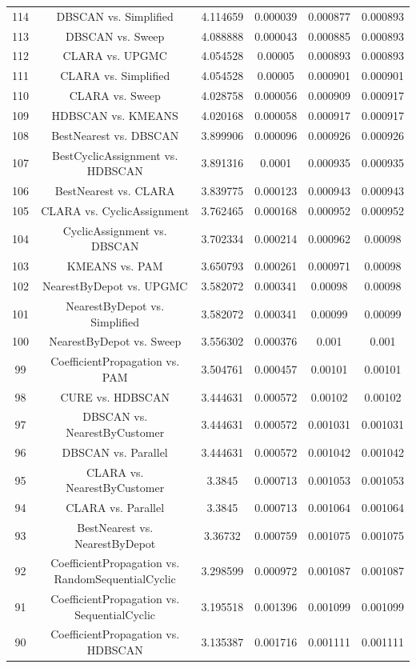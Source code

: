 \documentclass[a4paper,10pt]{article}
\begin{document}
\begin{landscape}
\begin{table}[!htp]
\begin{tabular}{cccccc}
114&DBSCAN vs. Simplified&4.114659&0.000039&0.000877&0.000893\\
113&DBSCAN vs. Sweep&4.088888&0.000043&0.000885&0.000893\\
112&CLARA vs. UPGMC&4.054528&0.00005&0.000893&0.000893\\
111&CLARA vs. Simplified&4.054528&0.00005&0.000901&0.000901\\
110&CLARA vs. Sweep&4.028758&0.000056&0.000909&0.000917\\
109&HDBSCAN vs. KMEANS&4.020168&0.000058&0.000917&0.000917\\
108&BestNearest vs. DBSCAN&3.899906&0.000096&0.000926&0.000926\\
107&BestCyclicAssignment vs. HDBSCAN&3.891316&0.0001&0.000935&0.000935\\
106&BestNearest vs. CLARA&3.839775&0.000123&0.000943&0.000943\\
105&CLARA vs. CyclicAssignment&3.762465&0.000168&0.000952&0.000952\\
104&CyclicAssignment vs. DBSCAN&3.702334&0.000214&0.000962&0.00098\\
103&KMEANS vs. PAM&3.650793&0.000261&0.000971&0.00098\\
102&NearestByDepot vs. UPGMC&3.582072&0.000341&0.00098&0.00098\\
101&NearestByDepot vs. Simplified&3.582072&0.000341&0.00099&0.00099\\
100&NearestByDepot vs. Sweep&3.556302&0.000376&0.001&0.001\\
99&CoefficientPropagation vs. PAM&3.504761&0.000457&0.00101&0.00101\\
98&CURE vs. HDBSCAN&3.444631&0.000572&0.00102&0.00102\\
97&DBSCAN vs. NearestByCustomer&3.444631&0.000572&0.001031&0.001031\\
96&DBSCAN vs. Parallel&3.444631&0.000572&0.001042&0.001042\\
95&CLARA vs. NearestByCustomer&3.3845&0.000713&0.001053&0.001053\\
94&CLARA vs. Parallel&3.3845&0.000713&0.001064&0.001064\\
93&BestNearest vs. NearestByDepot&3.36732&0.000759&0.001075&0.001075\\
92&CoefficientPropagation vs. RandomSequentialCyclic&3.298599&0.000972&0.001087&0.001087\\
91&CoefficientPropagation vs. SequentialCyclic&3.195518&0.001396&0.001099&0.001099\\
90&CoefficientPropagation vs. HDBSCAN&3.135387&0.001716&0.001111&0.001111\\

\end{tabular}
\end{table}
\end{landscape}
\end{document}
